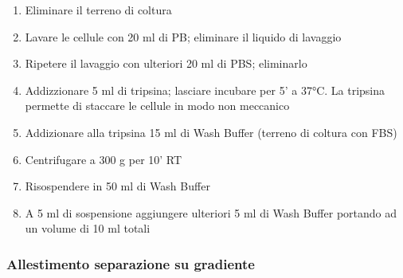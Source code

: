 \begin{enumerate}

    \item Eliminare il terreno di coltura

    \item Lavare le cellule con 20 ml di PB; eliminare il liquido di lavaggio

    \item Ripetere il lavaggio con ulteriori 20 ml di PBS; eliminarlo

    \item Addizzionare 5 ml di tripsina; lasciare incubare per 5' a 37°C. La tripsina permette di staccare le cellule in modo non meccanico

    \item Addizionare alla tripsina 15 ml di Wash Buffer (terreno di coltura con FBS)

    \item Centrifugare a 300 g per 10' RT

    \item Risospendere in 50 ml di Wash Buffer

    \item A 5 ml di sospensione aggiungere ulteriori 5 ml di Wash Buffer portando ad un volume di 10 ml totali

\end{enumerate}

\subsubsection{Allestimento separazione su gradiente}

